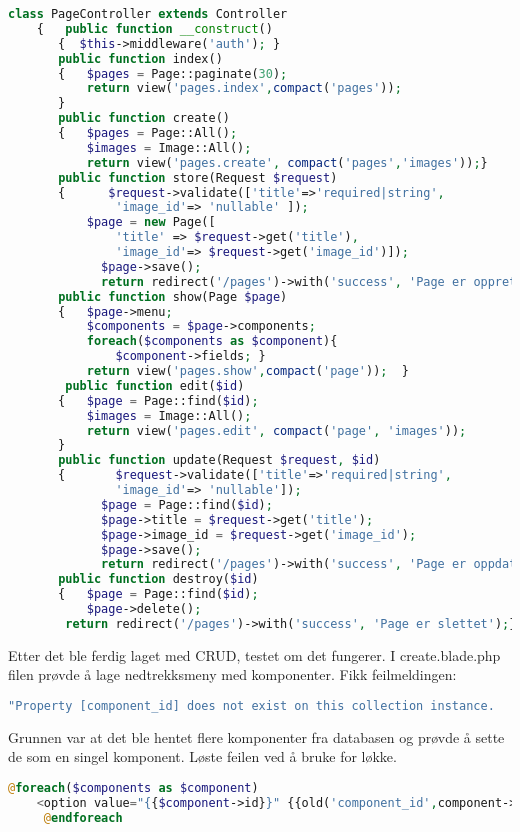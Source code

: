\begin{lstlisting}[language=PHP]
    class PageController extends Controller
    {   public function __construct()
       {  $this->middleware('auth'); }
       public function index()
       {   $pages = Page::paginate(30);
           return view('pages.index',compact('pages'));
       }
       public function create()
       {   $pages = Page::All();
           $images = Image::All();
           return view('pages.create', compact('pages','images'));}
       public function store(Request $request)
       {      $request->validate(['title'=>'required|string',
               'image_id'=> 'nullable' ]);
           $page = new Page([
               'title' => $request->get('title'),
               'image_id'=> $request->get('image_id')]);
             $page->save();
             return redirect('/pages')->with('success', 'Page er opprettet'); }
       public function show(Page $page)
       {   $page->menu;
           $components = $page->components;
           foreach($components as $component){
               $component->fields; }
           return view('pages.show',compact('page'));  }
        public function edit($id)
       {   $page = Page::find($id);
           $images = Image::All();
           return view('pages.edit', compact('page', 'images'));
       }
       public function update(Request $request, $id)
       {	   $request->validate(['title'=>'required|string',
               'image_id'=> 'nullable']);
             $page = Page::find($id);
             $page->title = $request->get('title');
             $page->image_id = $request->get('image_id');
             $page->save();
             return redirect('/pages')->with('success', 'Page er oppdatert'); }
       public function destroy($id)
       {   $page = Page::find($id);
           $page->delete();
        return redirect('/pages')->with('success', 'Page er slettet');}}
\end{lstlisting}

Etter det ble ferdig laget med CRUD, testet om det fungerer.
I create.blade.php filen prøvde å lage nedtrekksmeny med komponenter.
Fikk feilmeldingen:
\begin{lstlisting}[language=PHP]
    "Property [component_id] does not exist on this collection instance.
\end{lstlisting}

Grunnen var at det ble hentet flere komponenter fra databasen og prøvde å sette de som en singel komponent.
Løste feilen ved å bruke for løkke.
\begin{lstlisting}[language=PHP]
    @foreach($components as $component)
    <option value="{{$component->id}}" {{old('component_id',component->id)}}? selected> {{$component->name}} </option>
     @endforeach
\end{lstlisting} 

